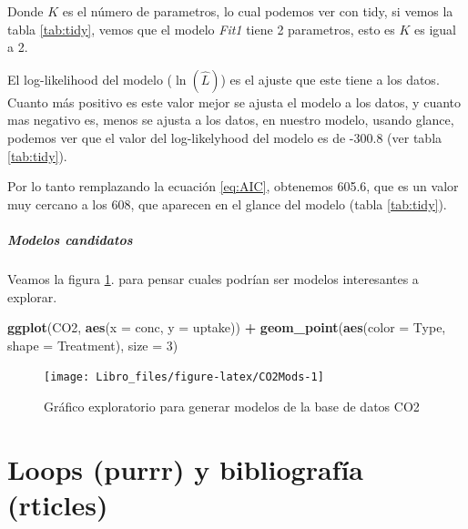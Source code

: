\documentclass[]{book}
\newenvironment{Shaded}{\begin{snugshade}}{\end{snugshade}}
\newcommand{\DataTypeTok}[1]{\textcolor[rgb]{0.13,0.29,0.53}{#1}}
\newcommand{\DecValTok}[1]{\textcolor[rgb]{0.00,0.00,0.81}{#1}}
\newcommand{\KeywordTok}[1]{\textcolor[rgb]{0.13,0.29,0.53}{\textbf{#1}}}
\newcommand{\NormalTok}[1]{#1}
\newcommand{\OperatorTok}[1]{\textcolor[rgb]{0.81,0.36,0.00}{\textbf{#1}}}
\newcommand{\StringTok}[1]{\textcolor[rgb]{0.31,0.60,0.02}{#1}}
\let\oldparagraph\paragraph
\renewcommand{\paragraph}[1]{\oldparagraph{#1}\mbox{}}
\begin{document}
Donde \(K\) es el número de parametros, lo cual podemos ver con tidy, si
vemos la tabla \ref{tab:tidy}, vemos que el modelo \emph{Fit1} tiene 2
parametros, esto es \(K\) es igual a 2.

El log-likelihood del modelo (\(\ln{(\hat{L})}\)) es el ajuste que este
tiene a los datos. Cuanto más positivo es este valor mejor se ajusta el
modelo a los datos, y cuanto mas negativo es, menos se ajusta a los
datos, en nuestro modelo, usando glance, podemos ver que el valor del
log-likelyhood del modelo es de -300.8 (ver tabla \ref{tab:tidy}).

Por lo tanto remplazando la ecuación \eqref{eq:AIC}, obtenemos 605.6, que
es un valor muy cercano a los 608, que aparecen en el glance del modelo
(tabla \ref{tab:tidy}).

\hypertarget{modelos-candidatos}{%
\paragraph{Modelos candidatos}\label{modelos-candidatos}}

Veamos la figura \ref{fig:CO2Mods}. para pensar cuales podrían ser
modelos interesantes a explorar.

\begin{Shaded}
\begin{Highlighting}[]
\KeywordTok{ggplot}\NormalTok{(CO2, }\KeywordTok{aes}\NormalTok{(}\DataTypeTok{x =}\NormalTok{ conc, }\DataTypeTok{y =}\NormalTok{ uptake)) }\OperatorTok{+}\StringTok{ }\KeywordTok{geom_point}\NormalTok{(}\KeywordTok{aes}\NormalTok{(}\DataTypeTok{color =}\NormalTok{ Type, }
    \DataTypeTok{shape =}\NormalTok{ Treatment), }\DataTypeTok{size =} \DecValTok{3}\NormalTok{)}
\end{Highlighting}
\end{Shaded}

\begin{figure}

{\centering \texttt{[image: Libro\_files/figure-latex/CO2Mods-1]} 

}

\caption{Gráfico exploratorio para generar modelos de la base de datos CO2}\label{fig:CO2Mods}
\end{figure}

\hypertarget{loops}{%
\chapter{Loops (purrr) y bibliografía (rticles)}\label{loops}}
\end{document}
